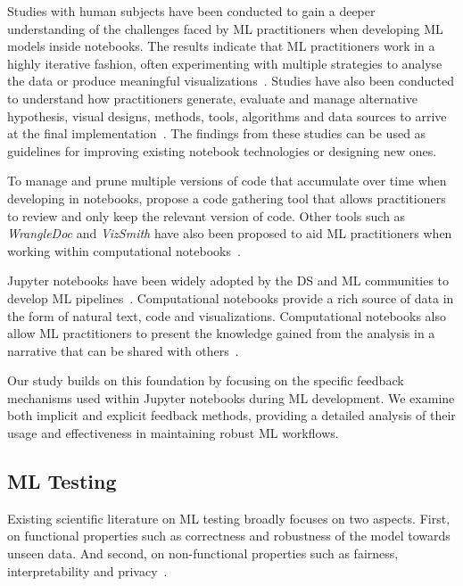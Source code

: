 \documentclass[smallextended]{svjour3}       %
\begin{document}
Studies with human subjects have been conducted to gain a deeper understanding of the challenges faced by ML practitioners when developing ML models inside notebooks. The results indicate that ML practitioners work in a highly iterative fashion, often experimenting with multiple strategies to analyse the data or produce meaningful visualizations~\citep{kandel2012enterprise,kery2018story,liu2019understanding,chattopadhyay2020whats}. Studies have also been conducted to understand how practitioners generate, evaluate and manage alternative hypothesis, visual designs, methods, tools, algorithms and data sources to arrive at the final implementation~\citep{liu2019understanding,kandel2012enterprise}. The findings from these studies can be used as guidelines for improving existing notebook technologies or designing new ones.

To manage and prune multiple versions of code that accumulate over time when developing in notebooks, \citet{head2019managing} propose a code gathering tool that allows practitioners to review and only keep the relevant version of code. Other tools such as \textit{WrangleDoc} and \textit{VizSmith} have also been proposed to aid ML practitioners when working within computational notebooks~\citep{yang2021subtle,bavishi2021vizsmith}.

Jupyter notebooks have been widely adopted by the DS and ML communities to develop ML pipelines~\citep{wang2020assessing,pimentel2019large-scale,quaranta2021kgtorrent}. Computational notebooks provide a rich source of data in the form of natural text, code and visualizations. Computational notebooks also allow ML practitioners to present the knowledge gained from the analysis in a narrative that can be shared with others~\citep{rule2018exploration}.

Our study builds on this foundation by focusing on the specific feedback mechanisms used within Jupyter notebooks during ML development. We examine both implicit and explicit feedback methods, providing a detailed analysis of their usage and effectiveness in maintaining robust ML workflows.

\subsection{ML Testing}\label{sec:ml-testing}

Existing scientific literature on ML testing broadly focuses on two aspects. First, on functional properties such as correctness and robustness of the model towards unseen data. And second, on non-functional properties such as fairness, interpretability and privacy~\citep{zhang2022machine,mehrabi2021survey,chen2022fairness}.
\end{document}
